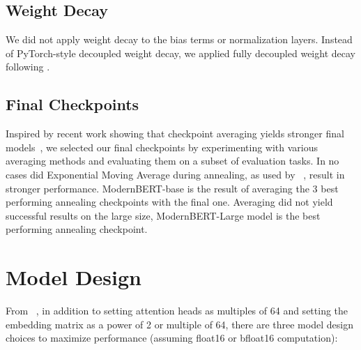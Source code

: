 \documentclass[11pt]{article}
\begin{document}
\subsection{Weight Decay}
\label{subsec:weightdecay}
We did not apply weight decay to the bias terms or normalization layers. Instead of PyTorch-style decoupled weight decay, we applied fully decoupled weight decay following \citet{adamw}.

\subsection{Final Checkpoints}
\label{subsec:finalcheckpoints}
Inspired by recent work showing that checkpoint averaging yields stronger final models~\cite{llama3,jacolbertv25}, we selected our final checkpoints by experimenting with various averaging methods and evaluating them on a subset of evaluation tasks. In no cases did Exponential Moving Average during annealing, as used by ~\citet{llama3}, result in stronger performance. ModernBERT-base is the result of averaging the 3 best performing annealing checkpoints with the final one. Averaging did not yield successful results on the large size, ModernBERT-Large model is the best performing annealing checkpoint.

\section{Model Design}
\label{app:modeldesign}

From ~\citet{codesigning}, in addition to setting attention heads as multiples of 64 and setting the embedding matrix as a power of 2 or multiple of 64, there are three model design choices to maximize performance (assuming float16 or bfloat16 computation):
\end{document}
